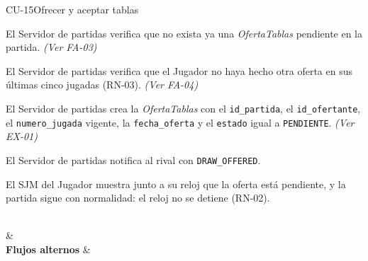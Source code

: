 \begin{fichacu}{CU-15}{Ofrecer y aceptar tablas}
{\begin{cuenum}[start=1]
      \item El Servidor de partidas verifica que no exista ya una \textit{OfertaTablas} pendiente en la partida. \textit{(Ver \mbox{FA-03})}
      \item El Servidor de partidas verifica que el Jugador no haya hecho otra oferta en sus últimas cinco jugadas (\mbox{RN-03}). \textit{(Ver \mbox{FA-04})}
      \item El Servidor de partidas crea la \textit{OfertaTablas} con el \texttt{id\_\allowbreak{}partida}, el \texttt{id\_\allowbreak{}ofertante}, el \texttt{numero\_\allowbreak{}jugada} vigente, la \texttt{fecha\_\allowbreak{}oferta} y el \texttt{estado} igual a \texttt{PENDIENTE}. \textit{(Ver \mbox{EX-01})}
      \item El Servidor de partidas notifica al rival con \texttt{DRAW\_\allowbreak{}OFFERED}.
      \item El SJM del Jugador muestra junto a su reloj que la oferta está pendiente, y la partida sigue con normalidad: el reloj no se detiene (\mbox{RN-02}).
    \end{cuenum}} \\
   &  \\ \hline
  \textbf{Flujos alternos} & 
\end{fichacu}
